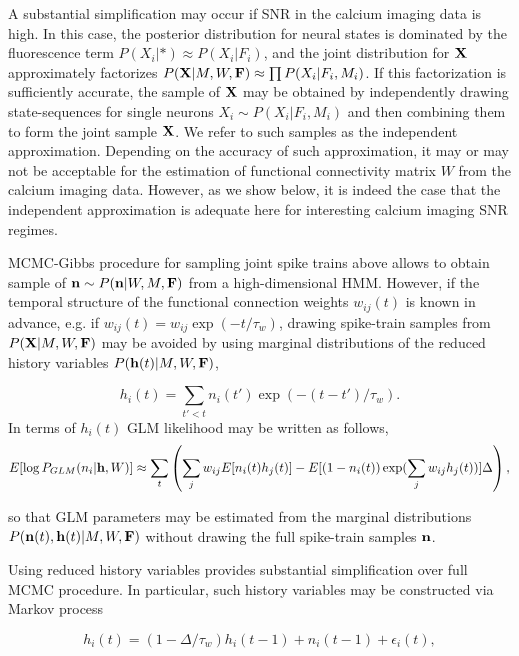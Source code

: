 A substantial simplification may occur if SNR in the calcium imaging data is high. In this case, the posterior distribution for neural states is dominated by the fluorescence term $P(X_i|*)\approx P(X_i|F_i)$, and the joint distribution for ${\bf X}$ approximately factorizes $P({\bf X}|M, W, {\bf F})\approx\prod P(X_i|F_i, M_i)$. If this factorization is sufficiently accurate, the sample of ${\bf X}$ may be obtained by independently drawing state-sequences for single neurons $X_i \sim P(X_i|F_i, M_i)$ and then combining them to form the joint sample ${\bf X}$.  We refer to such samples as the independent approximation. Depending on the accuracy of such approximation, it may or may not be acceptable for the estimation of functional connectivity matrix $W$ from the calcium imaging data. However, as we show below, it is indeed the case that the independent approximation is adequate here for interesting calcium imaging SNR regimes.

MCMC-Gibbs procedure for sampling joint spike trains above allows to obtain sample of ${\bf n}\sim P({\bf n}|W, M, {\bf F})$ from a high-dimensional HMM. However, if the temporal structure of the functional connection weights $w_{ij}(t)$ is known in advance, e.g. if $w_{ij}(t)=w_{ij}\exp(-t/\tau_w)$, drawing spike-train samples from $P({\bf X}|M, W, {\bf F})$ may be avoided by using marginal distributions of the reduced history variables $P({\bf h}(t)|M, W, {\bf F})$, 

\begin{equation}
h_i(t)=\sum\limits_{t'<t} n_i(t')\exp(-(t-t')/\tau_w).
\end{equation}
In terms of $h_i(t)$ GLM likelihood may be written as follows, 
\begin{equation}
E[\log P_{GLM}(n_i|{\bf h}, W)]\approx \sum_t \left(\sum\limits_{j} w_{ij} E[n_i(t) h_j(t)] -
E[(1-n_i(t)) \exp(\sum\limits_j w_{ij}h_j(t))] \Delta \right), 
\end{equation}

so that GLM parameters may be estimated from the marginal distributions $P({\bf n}(t), {\bf h}(t)|M, W, {\bf F})$ without drawing the full spike-train samples ${\bf n}$.

Using reduced history variables provides substantial simplification over full MCMC procedure. In particular, such history variables may be constructed via Markov process

\begin{equation}\label{eqn:spkhist:definition}
h_i(t)=(1-\Delta/\tau_w) h_i(t-1) + n_i(t-1) + \epsilon_i(t), 
\end{equation}

